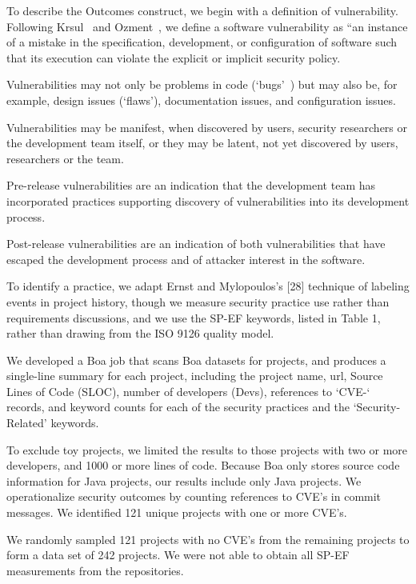 To describe the Outcomes construct, we begin with a definition of vulnerability. Following Krsul~\cite{krsul1998software} and Ozment~\cite{ozment2007vulnerability}, we define a software vulnerability as “an instance of a mistake in the specification, development, or configuration of software such that its execution can violate the explicit or implicit security policy.  


  Vulnerabilities may not only be problems in code (`bugs'~\cite{mcgraw2006software}) but may also be, for example, design issues (`flaws'), documentation issues, and configuration issues.  
  
  
  Vulnerabilities may be manifest, when discovered by users, security researchers or the development team itself, or they may be latent, not yet discovered by users, researchers or the team. 
  
  Pre-release vulnerabilities are an indication that the development team has incorporated practices supporting discovery of vulnerabilities into its development process. 
  
  Post-release vulnerabilities are an indication of both vulnerabilities that have escaped the development process and of attacker interest in the software.
  
To identify a practice, we adapt Ernst and Mylopoulos’s [28] technique of labeling events in project history, though we measure security practice use rather than requirements discussions, and we use the SP-EF keywords, listed in Table 1, rather than drawing from the ISO 9126 quality model. 

We developed a Boa job  that scans Boa datasets for projects, and produces a single-line summary for each project, including the project name, url, Source Lines of Code (SLOC), number of developers (Devs), references to ‘CVE-‘ records, and keyword counts for each of the security practices and the ‘Security-Related’ keywords.  

To exclude toy projects, we limited the results to those projects with two or more developers, and 1000 or more lines of code.  Because Boa only stores source code information for Java projects, our results include only Java projects. We operationalize security outcomes by counting references to CVE’s in commit messages.  We identified 121 unique projects with one or more CVE’s. 

We randomly sampled 121 projects with no CVE’s from the remaining projects to form a data set of 242 projects.
We were not able to obtain all SP-EF measurements from the repositories. 

